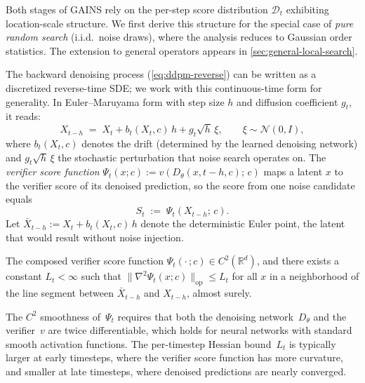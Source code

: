 Both stages of GAINS rely on the per-step score
distribution $\mathcal{D}_t$ exhibiting location-scale structure.
We first derive this structure for the special case of
\emph{pure random search} (i.i.d.\ noise draws), where the
analysis reduces to Gaussian order statistics.
The extension to general operators appears in
\cref{sec:general-local-search}.

The backward denoising process (\cref{eq:ddpm-reverse}) can be written as
a discretized reverse-time SDE; we work with this continuous-time form
for generality.
In Euler--Maruyama form with step size $h$ and diffusion coefficient $g_t$, it reads:
\begin{equation}
  X_{t-h} \;=\; X_t + b_t(X_t, c)\,h + g_t\sqrt{h}\,\xi,
  \qquad \xi \sim \mathcal{N}(0, I),
  \label{eq:euler-sde}
\end{equation}
where $b_t(X_t, c)$ denotes the drift (determined by the learned denoising network)
and $g_t\sqrt{h}\,\xi$ the stochastic perturbation that noise search
operates on.
The \emph{verifier score function}
$\Psi_t(x; c) := v(D_\theta(x, t{-}h, c);\, c)$
maps a latent $x$ to the verifier score of its denoised prediction,
so the score from one noise candidate equals
\begin{equation}
  S_t \;:=\; \Psi_t(X_{t-h};\, c).
  \label{eq:score-from-sde}
\end{equation}
Let $\bar{X}_{t-h} := X_t + b_t(X_t, c)\,h$ denote the deterministic Euler
point, the latent that would result without noise injection.

\begin{assumption}
\label{asm:smooth}
The composed verifier score function
$\Psi_t(\cdot\,; c) \in C^2(\mathbb{R}^d)$, and there exists a constant
$L_t < \infty$ such that
$\|\nabla^2 \Psi_t(x; c)\|_{\mathrm{op}} \le L_t$
for all $x$ in a neighborhood of the line segment between $\bar{X}_{t-h}$
and $X_{t-h}$, almost surely.
\end{assumption}

\begin{remark}
The $C^2$ smoothness of~$\Psi_t$ requires that both the denoising
network~$D_\theta$ and the verifier~$v$ are twice differentiable,
which holds for neural networks with standard smooth activation functions.
The per-timestep Hessian bound~$L_t$ is typically larger at early
timesteps, where the verifier score function has more curvature, and
smaller at late timesteps, where denoised predictions are nearly converged.
\end{remark}

